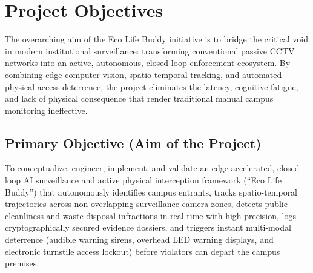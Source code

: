 \documentclass[12pt,a4paper]{report}
\begin{document}
\section{Project Objectives}
The overarching aim of the Eco Life Buddy initiative is to bridge the critical void in modern institutional surveillance: transforming conventional passive CCTV networks into an active, autonomous, closed-loop enforcement ecosystem. By combining edge computer vision, spatio-temporal tracking, and automated physical access deterrence, the project eliminates the latency, cognitive fatigue, and lack of physical consequence that render traditional manual campus monitoring ineffective.

\subsection{Primary Objective (Aim of the Project)}
To conceptualize, engineer, implement, and validate an edge-accelerated, closed-loop AI surveillance and active physical interception framework (``Eco Life Buddy'') that autonomously identifies campus entrants, tracks spatio-temporal trajectories across non-overlapping surveillance camera zones, detects public cleanliness and waste disposal infractions in real time with high precision, logs cryptographically secured evidence dossiers, and triggers instant multi-modal deterrence (audible warning sirens, overhead LED warning displays, and electronic turnstile access lockout) before violators can depart the campus premises.
\end{document}
